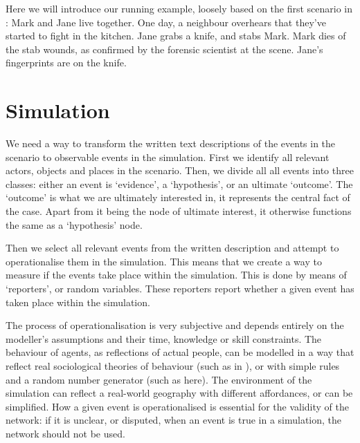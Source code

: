 \begin{example}
Here we will introduce our running example, loosely based on the first scenario in \citep{Vlek2015}: Mark and Jane live together. One day, a neighbour overhears that they've started to fight in the kitchen. Jane grabs a knife, and stabs Mark. Mark dies of the stab wounds, as confirmed by the forensic scientist at the scene. Jane's fingerprints are on the knife.
\end{example}

\section{Simulation}


We need a way to transform the written text descriptions of the events in the scenario to observable events in the simulation. First we identify all relevant actors, objects and places in the scenario. Then, we divide all all events into three classes: either an event is `evidence', a `hypothesis', or an ultimate `outcome'. The `outcome' is what we are ultimately interested in, it represents the central fact of the case. Apart from it being the node of ultimate interest, it otherwise functions the same as a `hypothesis' node.

Then we select all relevant events from the written description and attempt to operationalise them in the simulation. This means that we create a way to measure if the events take place within the simulation. This is done by means of `reporters', or random variables. These reporters report whether a given event has taken place within the simulation. 

The process of operationalisation is very subjective and depends entirely on the modeller's assumptions and their time, knowledge or skill constraints. The behaviour of agents, as reflections of actual people, can be modelled in a way that reflect real sociological theories of behaviour (such as in \citet{Gerritsen2015}), or with simple rules and a random number generator (such as here). The environment of the simulation can reflect a real-world geography with different affordances, or can be simplified. How a given event is operationalised is essential for the validity of the network: if it is unclear, or disputed, when an event is true in a simulation, the network should not be used.

